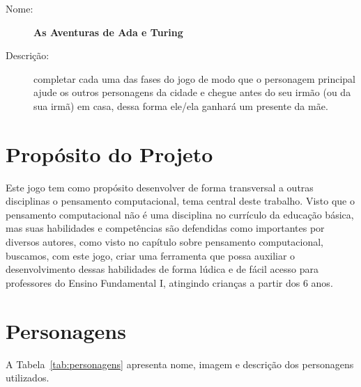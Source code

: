 \begin{description}
\item[Nome:] \textbf{As Aventuras de Ada e Turing}
\item[Descrição:] completar cada uma das fases do jogo de modo que o personagem principal ajude os outros personagens da cidade e chegue antes do seu irmão (ou da sua irmã) em casa, dessa forma ele/ela ganhará um presente da mãe.
\end{description}

\section{Propósito do Projeto} \label{sec:proposito}

Este jogo tem como propósito desenvolver de forma transversal a outras disciplinas o pensamento computacional, tema central deste trabalho. Visto que o pensamento computacional não é uma disciplina no currículo da educação básica, mas suas habilidades e competências são defendidas como importantes por diversos autores, como visto no capítulo sobre pensamento computacional, buscamos, com este jogo, criar uma ferramenta que possa auxiliar o desenvolvimento dessas habilidades de forma lúdica e de fácil acesso para professores do Ensino Fundamental I, atingindo crianças a partir dos 6 anos.

\section{Personagens} \label{sec:personagens}

A Tabela~\ref{tab:personagens} apresenta nome, imagem e descrição dos personagens utilizados.

